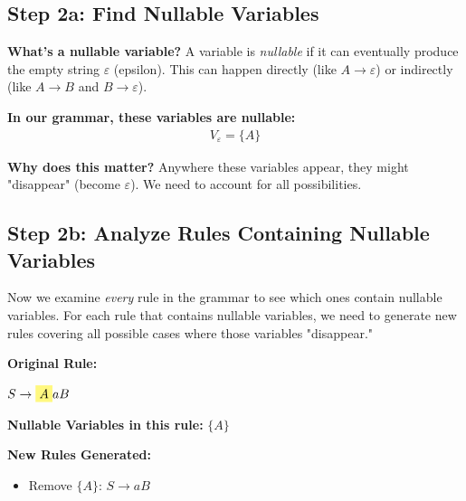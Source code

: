 \documentclass{article}
\begin{document}
\subsection{Step 2a: Find Nullable Variables}

\noindent\textbf{What's a nullable variable?} A variable is \textit{nullable} if it can eventually produce the empty string $\varepsilon$ (epsilon). This can happen directly (like $A \to \varepsilon$) or indirectly (like $A \to B$ and $B \to \varepsilon$).

\noindent\textbf{In our grammar, these variables are nullable:}
\begin{align*}
    V_{\varepsilon}=\{ A\}
\end{align*}


\noindent\textbf{Why does this matter?} Anywhere these variables appear, they might "disappear" (become $\varepsilon$). We need to account for all possibilities.


\subsection{Step 2b: Analyze Rules Containing Nullable Variables}

Now we examine \textit{every} rule in the grammar to see which ones contain nullable variables. For each rule that contains nullable variables, we need to generate new rules covering all possible cases where those variables "disappear."

\vspace{0.3cm}


\begin{tcolorbox}[colback=yellow!5!white,colframe=orange!75!black,title=Analysis of $S \to AaB$]

\textbf{Original Rule:} 

$S \to \colorbox{yellow!50}{$A$}aB$

\vspace{0.2cm}
\textbf{Nullable Variables in this rule:} $\{A\}$

\vspace{0.2cm}
\textbf{New Rules Generated:}
\begin{itemize}

    \item Remove $\{A\}$: \quad $S \to aB$


\end{itemize}

\end{tcolorbox}
\end{document}
